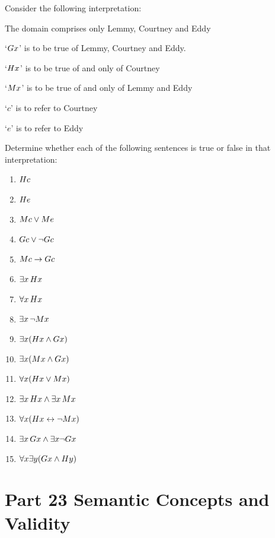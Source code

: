 \problempart
\label{pr.TorF2}
Consider the following interpretation:	
	\begin{ebullet}
		\item The domain comprises only Lemmy, Courtney and Eddy
		\item `$\mathord{G}x$' is to be true of Lemmy, Courtney and Eddy.
		\item `$\mathord{H}x$' is to be true of and only of Courtney
		\item `$\mathord{M}x$' is to be true of and only of Lemmy and Eddy
		\item `$c$' is to refer to Courtney
		\item `$e$' is to refer to Eddy
	\end{ebullet}
Determine whether each of the following sentences is true or false in that interpretation:
\begin{enumerate}
\item $\mathord{H}c $
\item $\mathord{H}e $
\item $\mathord{M}c  \vee \mathord{M}e$
\item $\mathord{G}c  \vee \neg \mathord{G}c$
\item $\mathord{M}c  \rightarrow \mathord{G}c$
\item $\exists x\, \mathord{H}x$
\item $\forall x\, \mathord{H}x$
\item $\exists x\, \neg \mathord{M}x$
\item $\exists x(\mathord{H}x \wedge \mathord{G}x)$
\item $\exists x(\mathord{M}x \wedge \mathord{G}x)$
\item $\forall x(\mathord{H}x \vee \mathord{M}x)$
\item $\exists x\, \mathord{H}x \wedge \exists x\, \mathord{M}x$
\item $\forall x(\mathord{H}x \leftrightarrow \neg \mathord{M}x)$
\item $\exists x\, \mathord{G}x \wedge \exists x \neg \mathord{G}x$
\item $\forall x\exists y(\mathord{G}x \wedge \mathord{H}y)$
\end{enumerate}

\chapter{Part 23 Semantic Concepts and Validity}
